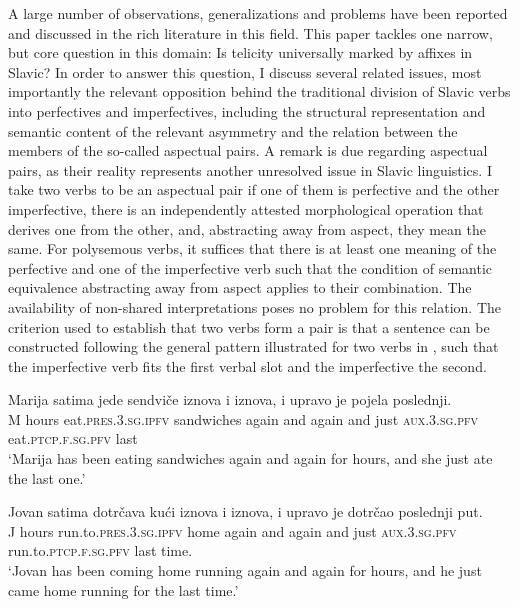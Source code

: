 \documentclass[output=paper]{langscibook}
\begin{document}
\noindent A large number of observations, generalizations and problems have been reported and discussed in the rich literature in this field. This paper tackles one narrow, but core question in this domain: Is telicity universally marked by affixes in Slavic? In order to answer this question, I discuss several related issues, most importantly the relevant opposition behind the traditional division of Slavic verbs into perfectives and imperfectives, including the structural representation and semantic content of the relevant asymmetry and the relation between the members of the so-called aspectual pairs. A remark is due regarding aspectual pairs, as their reality represents another unresolved issue in Slavic linguistics. I take two verbs to be an aspectual pair if one of them is perfective and the other imperfective, there is an independently attested morphological operation that derives one from the other, and, abstracting away from aspect, they mean the same. For polysemous verbs, it suffices that there is at least one meaning of the perfective and one of the imperfective verb such that the condition of semantic equivalence abstracting away from aspect applies to their combination. The availability of non-shared interpretations poses no problem for this relation. The criterion used to establish that two verbs form a pair is that a sentence can be constructed following the general pattern illustrated for two verbs in , such that the imperfective verb fits the first verbal slot and the imperfective the second.\largerpage[2]

\ea\label{ars:ex:paircrit}
	\begin{xlist} 

		\ex \gll Marija satima jede sendviče iznova i iznova, i upravo je pojela poslednji.\\
        M hours eat.\textsc{pres.3.sg.ipfv} sandwiches again and again and just \textsc{aux.3.sg.pfv} eat.\textsc{ptcp.f.sg.pfv} last\\
        \glt `Marija has been eating sandwiches again and again for hours, and she just ate the last one.'\label{ars:ex:paircrita}

		\ex \gll Jovan satima dotrčava kući iznova i iznova, i upravo je dotrčao poslednji put.\\
        J hours run.to.\textsc{pres.3.sg.ipfv} home again and again and just \textsc{aux.3.sg.pfv} run.to.\textsc{ptcp.f.sg.pfv} last time.\\
        \glt `Jovan has been coming home running again and again for hours, and he just came home running for the last time.'\label{ars:ex:paircritb}
		
	\end{xlist}
\z 
\end{document}
